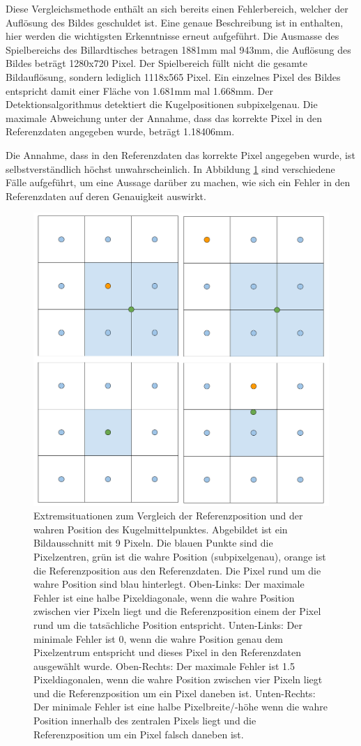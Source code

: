 Diese Vergleichsmethode enthält an sich bereits einen Fehlerbereich, welcher der Auflösung des Bildes geschuldet ist.
Eine genaue Beschreibung ist in \cite{project2:fehler_grundwahrheit} enthalten, hier werden die wichtigsten Erkenntnisse
erneut aufgeführt.
Die Ausmasse des Spielbereichs des Billardtisches betragen 1881mm mal 943mm, die Auflösung des Bildes beträgt 1280x720 Pixel.
Der Spielbereich füllt nicht die gesamte Bildauflösung, sondern lediglich 1118x565 Pixel.
Ein einzelnes Pixel des Bildes entspricht damit einer Fläche von 1.681mm mal 1.668mm.
Der Detektionsalgorithmus detektiert die Kugelpositionen subpixelgenau.
Die maximale Abweichung unter der Annahme, dass das korrekte Pixel in den Referenzdaten angegeben wurde, beträgt 1.18406mm.

Die Annahme, dass in den Referenzdaten das korrekte Pixel angegeben wurde, ist selbstverständlich höchst unwahrscheinlich.
In Abbildung \ref{fig:detektion_resultate_min_max_fehler_referenzdaten} sind verschiedene Fälle aufgeführt,
um eine Aussage darüber zu machen, wie sich ein Fehler in den Referenzdaten auf deren Genauigkeit auswirkt.

\begin{figure}[h!]
    \begin{center}
        \includegraphics[width=0.5\linewidth]{../common/04_results/resources/detektion_min_und_max_fehler.png}
    \end{center}
    \caption{
        Extremsituationen zum Vergleich der Referenzposition und der wahren Position des Kugelmittelpunktes.
        Abgebildet ist ein Bildausschnitt mit 9 Pixeln. Die blauen Punkte sind die Pixelzentren, grün ist die wahre Position (subpixelgenau), orange ist die Referenzposition aus den Referenzdaten.
        Die Pixel rund um die wahre Position sind blau hinterlegt.
        Oben-Links: Der maximale Fehler ist eine halbe Pixeldiagonale, wenn die wahre Position zwischen vier Pixeln liegt und die Referenzposition einem der Pixel rund um die tatsächliche Position entspricht.
        Unten-Links: Der minimale Fehler ist $0$, wenn die wahre Position genau dem Pixelzentrum entspricht und dieses Pixel in den Referenzdaten ausgewählt wurde.
        Oben-Rechts: Der maximale Fehler ist 1.5 Pixeldiagonalen, wenn die wahre Position zwischen vier Pixeln liegt und die Referenzposition um ein Pixel daneben ist.
        Unten-Rechts: Der minimale Fehler ist eine halbe Pixelbreite/-höhe wenn die wahre Position innerhalb des zentralen Pixels liegt und die Referenzposition um ein Pixel falsch daneben ist.
    }
    \label{fig:detektion_resultate_min_max_fehler_referenzdaten}
\end{figure}

